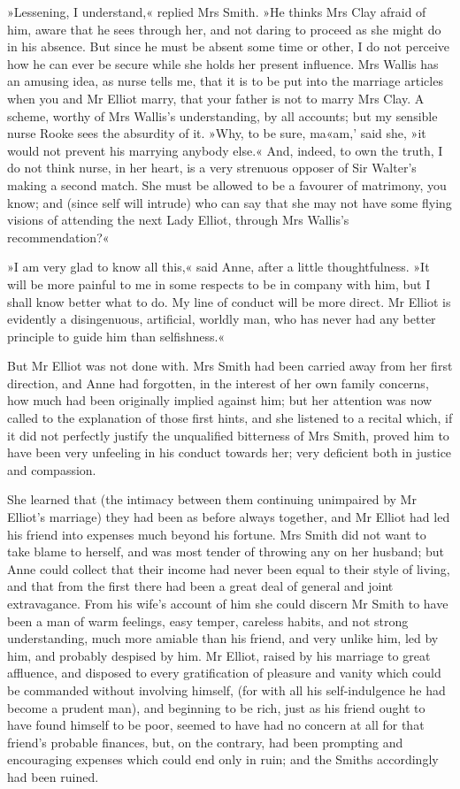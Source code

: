 »Lessening, I understand,« replied Mrs Smith. »He thinks Mrs Clay afraid of him, aware that he sees through her, and not daring to proceed as she might do in his absence. But since he must be absent some time or other, I do not perceive how he can ever be secure while she holds her present influence. Mrs Wallis has an amusing idea, as nurse tells me, that it is to be put into the marriage articles when you and Mr Elliot marry, that your father is not to marry Mrs Clay. A scheme, worthy of Mrs Wallis's understanding, by all accounts; but my sensible nurse Rooke sees the absurdity of it. »Why, to be sure, ma«am,' said she, »it would not prevent his marrying anybody else.« And, indeed, to own the truth, I do not think nurse, in her heart, is a very strenuous opposer of Sir Walter's making a second match. She must be allowed to be a favourer of matrimony, you know; and (since self will intrude) who can say that she may not have some flying visions of attending the next Lady Elliot, through Mrs Wallis's recommendation?«

»I am very glad to know all this,« said Anne, after a little thoughtfulness. »It will be more painful to me in some respects to be in company with him, but I shall know better what to do. My line of conduct will be more direct. Mr Elliot is evidently a disingenuous, artificial, worldly man, who has never had any better principle to guide him than selfishness.«

But Mr Elliot was not done with. Mrs Smith had been carried away from her first direction, and Anne had forgotten, in the interest of her own family concerns, how much had been originally implied against him; but her attention was now called to the explanation of those first hints, and she listened to a recital which, if it did not perfectly justify the unqualified bitterness of Mrs Smith, proved him to have been very unfeeling in his conduct towards her; very deficient both in justice and compassion.

She learned that (the intimacy between them continuing unimpaired by Mr Elliot's marriage) they had been as before always together, and Mr Elliot had led his friend into expenses much beyond his fortune. Mrs Smith did not want to take blame to herself, and was most tender of throwing any on her husband; but Anne could collect that their income had never been equal to their style of living, and that from the first there had been a great deal of general and joint extravagance. From his wife's account of him she could discern Mr Smith to have been a man of warm feelings, easy temper, careless habits, and not strong understanding, much more amiable than his friend, and very unlike him, led by him, and probably despised by him. Mr Elliot, raised by his marriage to great affluence, and disposed to every gratification of pleasure and vanity which could be commanded without involving himself, (for with all his self-indulgence he had become a prudent man), and beginning to be rich, just as his friend ought to have found himself to be poor, seemed to have had no concern at all for that friend's probable finances, but, on the contrary, had been prompting and encouraging expenses which could end only in ruin; and the Smiths accordingly had been ruined.

